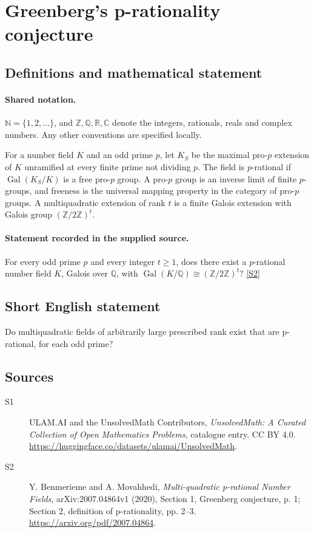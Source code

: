 \documentclass[11pt]{article}
\newcommand{\sref}[2]{\hyperlink{source:#1:#2}{[S#2]}}
\begin{document}
\section{Greenberg's p-rationality conjecture}\label{statement}

\subsection{Definitions and mathematical statement}

\paragraph{Shared notation.}$\mathbb N=\{1,2,\ldots\}$, and $\mathbb Z,\mathbb Q,\mathbb R,\mathbb C$ denote the integers, rationals, reals and complex numbers. Any other conventions are specified locally.


For a number field $K$ and an odd prime $p$, let $K_S$ be the maximal pro-$p$ extension of $K$ unramified at every finite prime not dividing $p$. The field is $p$-rational if $\operatorname{Gal}(K_S/K)$ is a free pro-$p$ group. A pro-$p$ group is an inverse limit of finite $p$-groups, and freeness is the universal mapping property in the category of pro-$p$ groups. A multiquadratic extension of rank $t$ is a finite Galois extension with Galois group $(\mathbb Z/2\mathbb Z)^t$.
\paragraph{Statement recorded in the supplied source.}
For every odd prime $p$ and every integer $t\ge1$, does there exist a $p$-rational number field $K$, Galois over $\mathbb Q$, with $\operatorname{Gal}(K/\mathbb Q)\cong(\mathbb Z/2\mathbb Z)^t$? \sref{statement}{2}
\subsection{Short English statement}
Do multiquadratic fields of arbitrarily large prescribed rank exist that are p-rational, for each odd prime?
\subsection{Sources}
\begin{description}
\item[\hypertarget{source:statement:1}{S1}] ULAM.AI and the UnsolvedMath Contributors, \emph{UnsolvedMath: A Curated Collection of Open Mathematics Problems}, catalogue entry. CC BY 4.0. \url{https://huggingface.co/datasets/ulamai/UnsolvedMath}.
\item[\hypertarget{source:statement:2}{S2}] Y. Benmerieme and A. Movahhedi, \emph{Multi-quadratic p-rational Number Fields}, arXiv:2007.04864v1 (2020), Section 1, Greenberg conjecture, p. 1; Section 2, definition of p-rationality, pp. 2--3. \url{https://arxiv.org/pdf/2007.04864}.
\end{description}
\label{end:statement}
\end{document}
